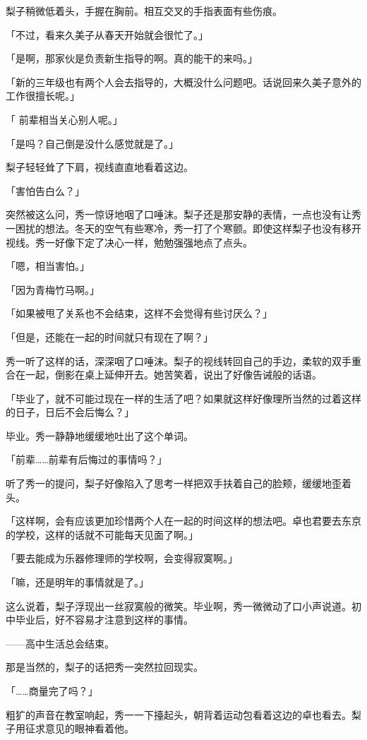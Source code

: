 \documentclass[UTF8]{ctexart}
\begin{document}
    梨子稍微低着头，手握在胸前。相互交叉的手指表面有些伤痕。

    「不过，看来久美子从春天开始就会很忙了。」

    「是啊，那家伙是负责新生指导的啊。真的能干的来吗。」

    「新的三年级也有两个人会去指导的，大概没什么问题吧。话说回来久美子意外的工作很擅长呢。」

    「 前辈相当关心别人呢。」

    「是吗？自己倒是没什么感觉就是了。」

    梨子轻轻耸了下肩，视线直直地看着这边。

    「害怕告白么？」

    突然被这么问，秀一惊讶地咽了口唾沫。梨子还是那安静的表情，一点也没有让秀一困扰的想法。冬天的空气有些寒冷，秀一打了个寒颤。即使这样梨子也没有移开视线。秀一好像下定了决心一样，勉勉强强地点了点头。

    「嗯，相当害怕。」

    「因为青梅竹马啊。」

    「如果被甩了关系也不会结束，这样不会觉得有些讨厌么？」

    「但是，还能在一起的时间就只有现在了啊？」

    秀一听了这样的话，深深咽了口唾沫。梨子的视线转回自己的手边，柔软的双手重合在一起，倒影在桌上延伸开去。她苦笑着，说出了好像告诫般的话语。

    「毕业了，就不可能过现在一样的生活了吧？如果就这样好像理所当然的过着这样的日子，日后不会后悔么？」

    毕业。秀一静静地缓缓地吐出了这个单词。

    「前辈……前辈有后悔过的事情吗？」

    听了秀一的提问，梨子好像陷入了思考一样把双手扶着自己的脸颊，缓缓地歪着头。

    「这样啊，会有应该更加珍惜两个人在一起的时间这样的想法吧。卓也君要去东京的学校，这样的话就不可能每天见面了啊。」

    「要去能成为乐器修理师的学校啊，会变得寂寞啊。」

    「嘛，还是明年的事情就是了。」

    这么说着，梨子浮现出一丝寂寞般的微笑。毕业啊，秀一微微动了口小声说道。初中毕业后，好不容易才注意到这样的事情。

    ——高中生活总会结束。

    那是当然的，梨子的话把秀一突然拉回现实。

    「……商量完了吗？」

    粗犷的声音在教室响起，秀一一下擡起头，朝背着运动包看着这边的卓也看去。梨子用征求意见的眼神看着他。
\end{document}
